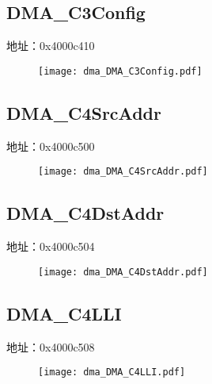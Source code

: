 \subsection{DMA\_C3Config}
\label{dma-DMA-C3Config}
地址：0x4000c410
 \begin{figure}[H]
\texttt{[image: dma\_DMA\_C3Config.pdf]}
\end{figure}

\subsection{DMA\_C4SrcAddr}
\label{dma-DMA-C4SrcAddr}
地址：0x4000c500
 \begin{figure}[H]
\texttt{[image: dma\_DMA\_C4SrcAddr.pdf]}
\end{figure}

\subsection{DMA\_C4DstAddr}
\label{dma-DMA-C4DstAddr}
地址：0x4000c504
 \begin{figure}[H]
\texttt{[image: dma\_DMA\_C4DstAddr.pdf]}
\end{figure}

\subsection{DMA\_C4LLI}
\label{dma-DMA-C4LLI}
地址：0x4000c508
 \begin{figure}[H]
\texttt{[image: dma\_DMA\_C4LLI.pdf]}
\end{figure}

